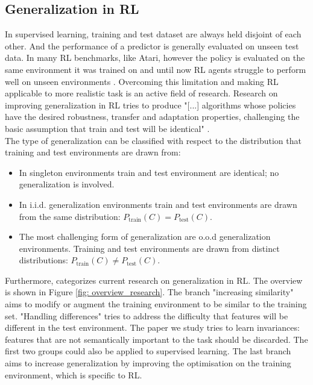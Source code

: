 \documentclass{usiinftr}
\begin{document}
\subsection{Generalization in RL}
In supervised learning, training and test dataset are always held disjoint of each other.
And the performance of a predictor is generally evaluated on unseen test data.
In many RL benchmarks, like Atari, however the policy is evaluated on the same environment it was trained on and until now RL agents struggle to perform well on unseen environments \cite{lee2020network}.
Overcoming this limitation and making RL applicable to more realistic task is an active field of research.
Research on improving generalization in RL tries to produce "[...] algorithms whose policies have the desired
robustness, transfer and adaptation properties, challenging the basic assumption that train and test will be identical" \cite{kirk2021survey}.
\\
The type of generalization can be classified with respect to the distribution that training and test environments are drawn from: \cite{kirk2021survey}
\begin{itemize}
\item In singleton environments train and test environment are identical; no generalization is involved.
\item In i.i.d. generalization environments train and test environments are drawn from the same distribution: $P_{\text{train}} (C) = P_{\text{test}}(C)$.
\item The most challenging form of generalization are o.o.d generalization environments. Training and test environments are drawn from distinct distributions: $P_{\text{train}} (C) \neq P_{\text{test}}(C)$.
\end{itemize}
Furthermore, \cite{kirk2021survey} categorizes current research on generalization in RL.
The overview is shown in Figure \ref{fig: overview_research}. 
The branch "increasing similarity" aims to modify or augment the training environment to be similar to the training set.
"Handling differences" tries to address the difficulty that features will be different in the test environment. The paper we study tries to learn invariances: features that are not semantically important to the task should be discarded.
The first two groups could also be applied to supervised learning. The last branch aims to increase generalization by improving the optimisation on the training environment, which is specific to RL.
\end{document}
